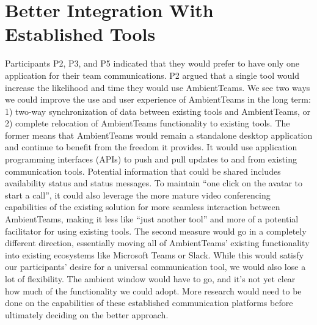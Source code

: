 \section{Better Integration With Established Tools}
\label{section:better_integration_with_established_tools}
Participants P2, P3, and P5 indicated that they would prefer to have only one application for their team communications. P2 argued that a single tool would increase the likelihood and time they would use AmbientTeams. We see two ways we could improve the use and user experience of AmbientTeams in the long term: 1) two-way synchronization of data between existing tools and AmbientTeams, or 2) complete relocation of AmbientTeams functionality to existing tools. The former means that AmbientTeams would remain a standalone desktop application and continue to benefit from the freedom it provides. It would use application programming interfaces (APIs) to push and pull updates to and from existing communication tools. Potential information that could be shared includes availability status and status messages. To maintain \enquote{one click on the avatar to start a call}, it could also leverage the more mature video conferencing capabilities of the existing solution for more seamless interaction between AmbientTeams, making it less like \enquote{just another tool} and more of a potential facilitator for using existing tools. The second measure would go in a completely different direction, essentially moving all of AmbientTeams' existing functionality into existing ecosystems like Microsoft Teams or Slack. While this would satisfy our participants' desire for a universal communication tool, we would also lose a lot of flexibility. The ambient window would have to go, and it's not yet clear how much of the functionality we could adopt. More research would need to be done on the capabilities of these established communication platforms before ultimately deciding on the better approach.

